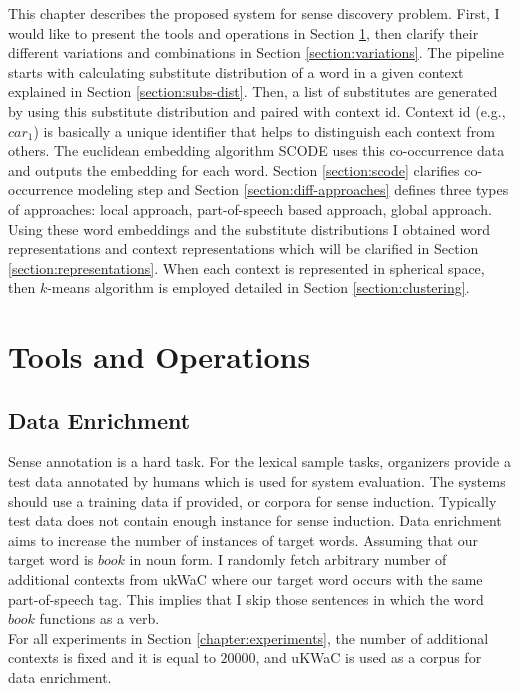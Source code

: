 This chapter describes the proposed system for sense discovery problem. First, I would like to present the tools and operations in Section \ref{section:operations}, then clarify their different variations and combinations in Section \ref{section:variations}. The pipeline starts with calculating substitute distribution of a word in a given context explained in Section \ref{section:subs-dist}. Then, a list of substitutes are generated by using this substitute distribution and paired with context id. Context id (e.g., $car_1$) is basically a unique identifier that helps to distinguish each context from others. The euclidean embedding algorithm SCODE uses this co-occurrence data and outputs the embedding for each word. Section \ref{section:scode} clarifies co-occurrence modeling step and Section \ref{section:diff-approaches} defines three types of approaches: local approach, part-of-speech based approach, global approach. Using these word embeddings and the substitute distributions I obtained word representations and context representations which will be clarified in Section \ref{section:representations}. When each context is represented in spherical space, then $k$-means algorithm is employed detailed in Section \ref{section:clustering}.


\section{Tools and Operations}
\label{section:operations}


\subsection{Data Enrichment}
\label{section:enrichment}

Sense annotation is a hard task. For the lexical sample tasks, organizers provide a test data annotated by humans which is used for system evaluation. The systems should use a training data if provided, or corpora for sense induction. Typically test data does not contain enough instance for sense induction. Data enrichment aims to increase the number of instances of target words. Assuming that our target word is $book$ in noun form. I randomly fetch arbitrary number of additional contexts from ukWaC where our target word occurs with the same part-of-speech tag. This implies that I skip those sentences in which the word $book$ functions as a verb. \\

For all experiments in Section \ref{chapter:experiments}, the number of additional contexts is fixed and it is equal to $20000$, and uKWaC is used as a corpus for data enrichment.

